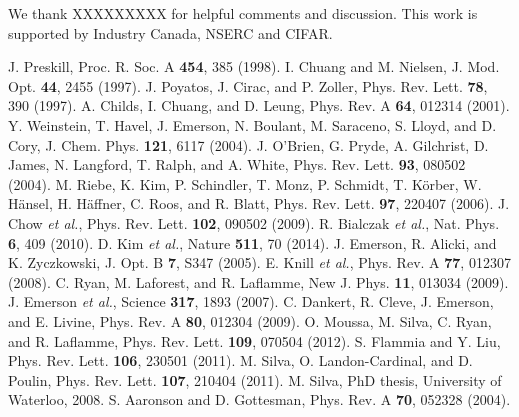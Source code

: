 \documentclass[prl,twocolumn,showpacs]{revtex4-1}
\begin{document}
We thank XXXXXXXXX for helpful comments and discussion. This work is supported by Industry Canada, NSERC and CIFAR.

\begin{thebibliography}{99}
 J. Preskill, Proc. R. Soc. A \textbf{454}, 385 (1998).
 I. Chuang and M. Nielsen, J. Mod. Opt. \textbf{44}, 2455 (1997).
 J. Poyatos, J. Cirac, and P. Zoller, Phys. Rev. Lett. \textbf{78}, 390 (1997).
 A. Childs, I. Chuang, and D. Leung, Phys. Rev. A \textbf{64}, 012314 (2001).
 Y. Weinstein, T. Havel, J. Emerson, N. Boulant, M. Saraceno, S. Lloyd, and D. Cory, J. Chem. Phys. \textbf{121}, 6117 (2004).
 J. O'Brien, G. Pryde, A. Gilchrist, D. James, N. Langford, T. Ralph, and A. White, Phys. Rev. Lett. \textbf{93}, 080502 (2004).
 M. Riebe, K. Kim, P. Schindler, T. Monz, P. Schmidt, T. K\"{o}rber, W. H\"{a}nsel, H. H\"{a}ffner, C. Roos, and R. Blatt, Phys. Rev. Lett. \textbf{97}, 220407 (2006).
 J. Chow \emph{et al.}, Phys. Rev. Lett. \textbf{102}, 090502 (2009).
 R. Bialczak \emph{et al.}, Nat. Phys. \textbf{6}, 409 (2010).
 D. Kim \emph{et al.}, Nature \textbf{511}, 70 (2014).
 J. Emerson, R. Alicki, and K. Zyczkowski, J. Opt. B \textbf{7}, S347 (2005).
 E. Knill \emph{et al.}, Phys. Rev. A \textbf{77}, 012307 (2008).
 C. Ryan, M. Laforest, and R. Laflamme, New J. Phys. \textbf{11}, 013034 (2009).
 J. Emerson \emph{et al.}, Science \textbf{317}, 1893 (2007).
 C. Dankert, R. Cleve, J. Emerson, and E. Livine, Phys. Rev. A \textbf{80}, 012304 (2009).
 O. Moussa, M. Silva, C. Ryan, and R. Laflamme, Phys. Rev. Lett. \textbf{109}, 070504 (2012).
 S. Flammia and Y. Liu, Phys. Rev. Lett. \textbf{106}, 230501 (2011).
 M. Silva, O. Landon-Cardinal, and D. Poulin, Phys. Rev. Lett. \textbf{107}, 210404 (2011).
 M. Silva, PhD thesis, University of Waterloo, 2008.
 S. Aaronson and D. Gottesman, Phys. Rev. A \textbf{70}, 052328 (2004).

\end{thebibliography}
\end{document}
